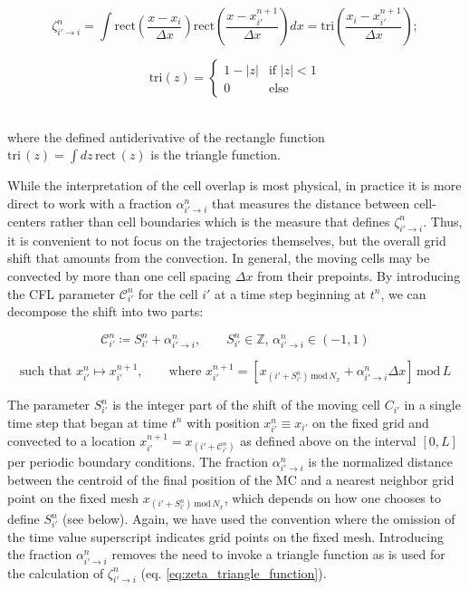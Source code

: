 \documentclass[11pt,titlepage]{report}
\begin{document}
\noindent\begin{minipage}{0.55\textwidth}
\quad$$\zeta^n_{i'\to i} = \int \mathrm{rect}\left(\frac{x - x_i}{\Delta x}\right)\mathrm{rect}\left(\frac{x - x^{n+1}_{i'}}{\Delta x}\right)dx = \mathrm{tri}\left(\frac{x_i - x^{n+1}_{i'}}{\Delta x}\right);$$
\end{minipage}
\begin{minipage}{0.45\textwidth}
\begin{equation}\mathrm{tri} (z) =
  \begin{cases}
   1 - |z| & \text{if } |z| < 1 \\[0.3em]
   0 & \text{else }
  \end{cases}
\label{eq:zeta_triangle_function}\end{equation}
\end{minipage}\\[1em]

\noindent where the defined antiderivative of the rectangle function $\mathrm{tri}\,(z) = \int dz\, \mathrm{rect}\,(z)$ is the triangle function.

While the interpretation of the cell overlap is most physical, in practice it is more direct to work with a fraction $\alpha_{i'\to i}^n$ that measures the distance between cell-centers rather than cell boundaries which is the measure that defines $\zeta_{i'\to i}^n$. Thus, it is convenient to not focus on the trajectories themselves, but the overall grid shift that amounts from the convection. In general, the moving cells may be convected by more than one cell spacing $\Delta x$ from their prepoints. By introducing the CFL parameter $\mathcal{C}_{i'}^n$ for the cell $i'$ at a time step beginning at $t^n$, we can decompose the shift into two parts:

\begin{equation}\mathcal{C}_{i'}^n \coloneqq S_{i'}^n + \alpha_{i'\to i}^n, \qquad S_{i'}^n\in\mathbb{Z}, \, \alpha_{i'\to i}^n\in(-1,1)\label{eq:CFL_partition}\end{equation}

$$\textrm{such that } x_{i'}^n \mapsto x_{i'}^{n+1}, \qquad \textrm{where } x_{i'}^{n+1} = [x_{(i'+S_{i'}^n)\,\mathrm{mod}\,N_x} + \alpha_{i'\to i}^n \Delta x]\,\mathrm{mod}\,L$$

\noindent The parameter $S_{i'}^n$ is the integer part of the shift of the moving cell $C_{i'}$ in a single time step that began at time $t^n$ with position $x_{i'}^n \equiv x_{i'}$ on the fixed grid and convected to a location $x_{i'}^{n+1} = x_{(i' + \mathcal{C}_{i'}^n)}$ as defined above on the interval $[0,L]$ per periodic boundary conditions. The fraction $\alpha_{i'\to i}^n$ is the normalized distance between the centroid of the final position of the MC and a nearest neighbor grid point on the fixed mesh $x_{(i'+S_{i'}^n)\,\mathrm{mod}\,N_x}$, which depends on how one chooses to define $S_{i'}^n$ (see below). Again, we have used the convention where the omission of the time value superscript indicates grid points on the fixed mesh.  Introducing the fraction $\alpha_{i'\to i}^n$ removes the need to invoke a triangle function as is used for the calculation of $\zeta_{i'\to i}^n$ (eq. \eqref{eq:zeta_triangle_function}).
\end{document}
